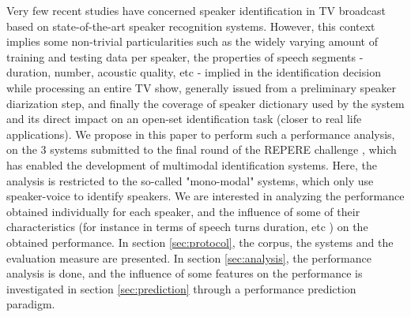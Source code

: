 Very few recent studies have concerned speaker identification in TV broadcast based on state-of-the-art speaker recognition systems. However, this context implies some non-trivial particularities such as the widely varying amount of training and testing data per speaker, the properties of speech segments - duration, number, acoustic quality, etc - implied in the identification decision while processing an entire TV show, generally issued from a preliminary speaker diarization step, and finally the coverage of speaker dictionary used by the system and its direct impact on an open-set identification task (closer to real life applications). We propose in this paper to perform such a performance analysis, on the 3 systems submitted to the final round of the REPERE challenge \cite{KAHN--CBMI--2012}, which has enabled the development of multimodal identification systems. Here, the analysis is restricted to the so-called "mono-modal" systems, which only use speaker-voice to identify speakers. We are interested in analyzing the performance obtained individually for each speaker, and the influence of some of their characteristics (for instance in terms of speech turns duration, etc ) on the obtained performance. In section \ref{sec:protocol}, the corpus, the systems and the evaluation measure are presented. In section \ref{sec:analysis}, the performance analysis is done, and the influence of some features on the performance is investigated in section \ref{sec:prediction} through a performance prediction paradigm.